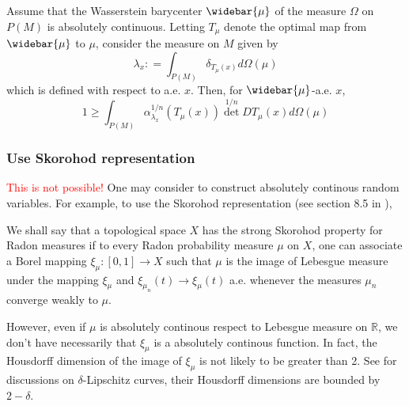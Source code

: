 \begin{thm}
	Assume that the Wasserstein barycenter \( \widebar { \mu } \) of the measure \( \Omega \) on \( P ( M ) \) is absolutely continuous.
	Letting \( T _ { \mu } \) denote the optimal map from \( \widebar { \mu } \) to \( \mu \), consider the measure on \( M \) given by
	\[ \lambda _ { x } : = \int _ { P ( M ) } \delta _ { T _ { \mu } ( x ) } d \Omega ( \mu ) \]
	which is defined with respect to a.e. $x$.
	Then, for \( \widebar { \mu } \)-a.e. \(x\),
	\[ 1 \geq \int _ { P ( M ) } \alpha _ { \lambda _ { x } } ^ { 1 / n } \left( T _ { \mu } ( x ) \right) \operatorname { det } ^ { 1 / n } D T _ { \mu } ( x ) d \Omega ( \mu ) \]
\end{thm}


\subsubsection{Use Skorohod representation}
\textcolor{red}{This is not possible!}
One may consider to construct absolutely continous random variables.
For example, to use the Skorohod representation (see section 8.5 in \cite{Bogachev2007}),
\begin{defn}
	We shall say that a topological space \( X \) has the strong
	Skorohod property for Radon measures if to every Radon probability measure
	\( \mu \) on \( X \),
	one can associate a Borel mapping \( \xi _ { \mu } : [ 0,1 ] \rightarrow X \) such that \( \mu \) is
	the image of Lebesgue measure under the mapping \( \xi _ { \mu } \) and \( \xi _ { \mu _ { n } } ( t ) \rightarrow \xi _ { \mu } ( t ) \) a.e.
	whenever the measures \( \mu _ { n } \) converge weakly to \( \mu . \)
\end{defn}

However, even if $\mu$ is absolutely continous respect to Lebesgue measure on $\mathbb{R}$,
we don't have necessarily that $\xi_{\mu}$ is a absolutely continous function.
In fact, the Housdorff dimension of the image of $\xi_{\mu}$ is not likely to be greater than 2.
See \cite{Besicov1937Sets} for discussions on $\delta$-Lipschitz curves,
their Housdorff dimensions are bounded by $2-\delta$.

